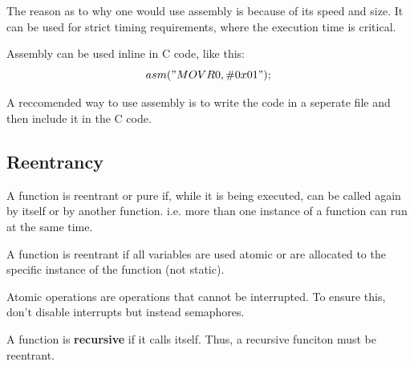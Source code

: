 The reason as to why one would use assembly is because of its speed and size.
It can be used for strict timing requirements, where the execution time
is critical.


Assembly can be used inline in C code, like this:
$$ asm("MOV R0, \#0x01"); $$

A reccomended way to use assembly is to write the code in a seperate
file and then include it in the C code.



\subsection{Reentrancy}

A function is reentrant or pure if, while it is being executed,
can be called again by itself or by another function.
i.e. more than one instance of a function can run at the same time.

A function is reentrant if all variables are used atomic
or are allocated to the specific instance of the function (not static).

Atomic operations are operations that cannot be interrupted.
To ensure this, don't disable interrupts but
instead semaphores.


A function is \textbf{recursive} if it calls itself.
Thus, a recursive funciton must be reentrant.
